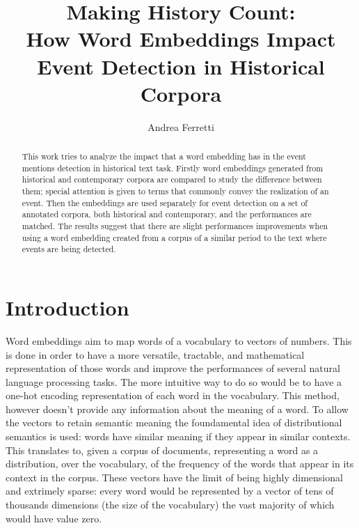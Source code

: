 \documentclass[runningheads]{llncs}
\begin{document}
%
\title{Making History Count:\\
How Word Embeddings Impact\\
Event Detection in Historical Corpora}

%
%
\author{Andrea Ferretti}
%
%
%
\maketitle              %
%
\begin{abstract}
This work tries to analyze the impact that a word embedding has in the event mentions detection in historical text task. Firstly word embeddings generated from historical and contemporary corpora are compared to study the difference between them; special attention is given to terms that commonly convey the realization of an event. Then the embeddings are used separately for event detection on a set of annotated corpora, both historical and contemporary, and the performances are matched. The results suggest that there are slight performances improvements when using a word embedding created from a corpus of a similar period to the text where events are being detected.

\end{abstract}
%
%
%
\section{Introduction}
Word embeddings aim to map words of a vocabulary to vectors of numbers. This is done in order to have a more versatile, tractable, and mathematical representation of those words and improve the performances of several natural language processing tasks. The more intuitive way to do so would be to have a one-hot encoding representation of each word in the vocabulary. This method, however doesn't provide any information about the meaning of a word. To allow the vectors to retain semantic meaning the foundamental idea of distributional semantics is used: words have similar meaning if they appear in similar contexts. This translates to, given a corpus of documents, representing a word as a distribution, over the vocabulary, of the frequency of the words that appear in its context in the corpus. These vectors have the limit of being highly dimensional and extrimely sparse: every word would be represented by a vector of tens of thousands dimensions (the size of the vocabulary) the vast majority of which would have value zero.
\end{document}
